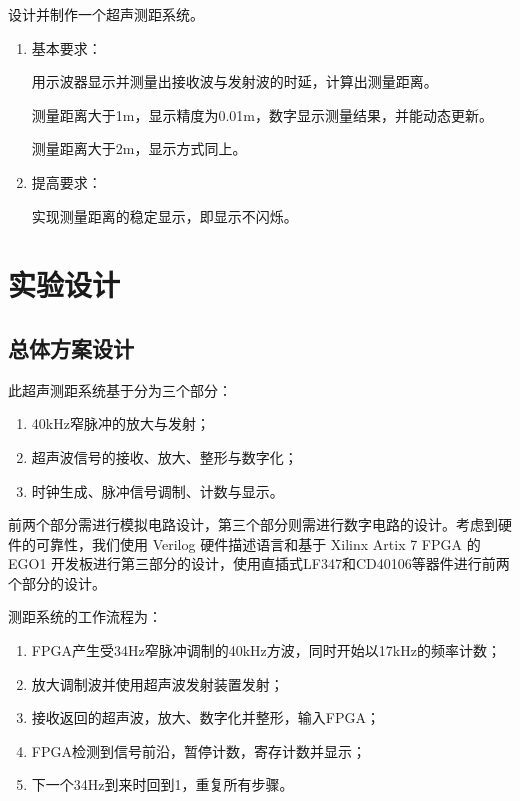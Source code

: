 \documentclass[a4paper, twocolumn]{ctexart}
\begin{document}
设计并制作一个超声测距系统。

\begin{enumerate}
    \item 基本要求：

          用示波器显示并测量出接收波与发射波的时延，计算出测量距离。

          测量距离大于1m，显示精度为0.01m，数字显示测量结果，并能动态更新。

          测量距离大于2m，显示方式同上。

    \item 提高要求：

          实现测量距离的稳定显示，即显示不闪烁。
\end{enumerate}



\section{实验设计}
\subsection{总体方案设计}
此超声测距系统基于分为三个部分：
\begin{enumerate}
    \item 40kHz窄脉冲的放大与发射；
    \item 超声波信号的接收、放大、整形与数字化；
    \item 时钟生成、脉冲信号调制、计数与显示。
\end{enumerate}

前两个部分需进行模拟电路设计，第三个部分则需进行数字电路的设计。考虑到硬件的可靠性，我们使用 Verilog 硬件描述语言和基于 Xilinx Artix 7 FPGA 的 EGO1 开发板进行第三部分的设计，使用直插式LF347和CD40106等器件进行前两个部分的设计。

测距系统的工作流程为：

\begin{enumerate}
    \item FPGA产生受34Hz窄脉冲调制的40kHz方波，同时开始以17kHz的频率计数；
    \item 放大调制波并使用超声波发射装置发射；
    \item 接收返回的超声波，放大、数字化并整形，输入FPGA；
    \item FPGA检测到信号前沿，暂停计数，寄存计数并显示；
    \item 下一个34Hz到来时回到1，重复所有步骤。
\end{enumerate}
\end{document}
